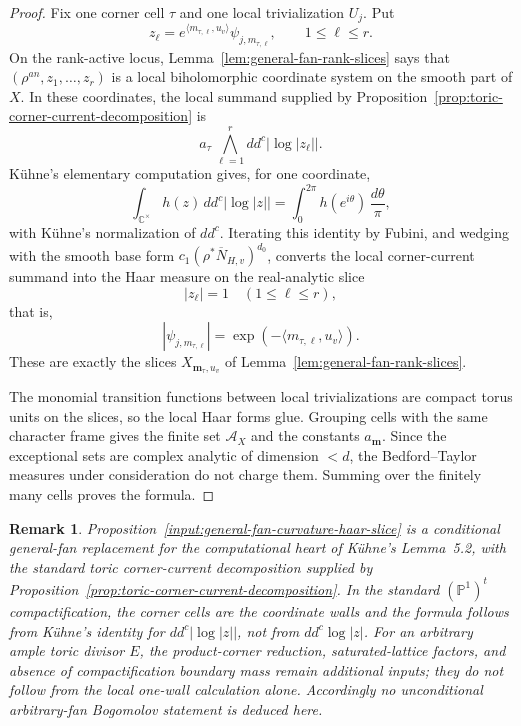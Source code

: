 \documentclass[10pt,a4paper]{amsart}
\theoremstyle{plain}
\newtheorem{remark}[theorem]{Remark}
\theoremstyle{plain}
\numberwithin{equation}{section}
\providecommand{\bN}{\overline{N}}
\begin{document}
\begin{proof}
	Fix one corner cell \(\tau\) and one local trivialization \(U_j\).  Put
	\[
	z_\ell
	=
	e^{\langle m_{\tau,\ell},u_v\rangle}
	\psi_{j,m_{\tau,\ell}},
	\qquad 1\le \ell\le r .
	\]
	On the rank-active locus, Lemma~\ref{lem:general-fan-rank-slices} says that
	\((\rho^{an},z_1,\ldots,z_r)\) is a local biholomorphic coordinate system on
	the smooth part of \(X\).  In these coordinates, the local summand supplied by
	Proposition~\ref{prop:toric-corner-current-decomposition} is
	\[
	a_\tau\,
	\bigwedge_{\ell=1}^r dd^c\bigl|\log|z_\ell|\bigr| .
	\]
	K\"uhne's elementary computation \cite[Appendix~B]{Ku1} gives, for one
	coordinate,
	\[
	\int_{\mathbb C^\times} h(z)\,dd^c\bigl|\log|z|\bigr|
	=
	\int_{0}^{2\pi}h(e^{i\theta})\,\frac{d\theta}{\pi},
	\]
	with K\"uhne's normalization of \(dd^c\).  Iterating this identity by Fubini,
	and wedging with the smooth base form
	\(c_1(\rho^*\bN_{H,v})^{d_0}\), converts the local corner-current summand into
	the Haar measure on the real-analytic slice
	\[
	|z_\ell|=1
	\quad(1\le \ell\le r),
	\]
	that is,
	\[
	|\psi_{j,m_{\tau,\ell}}|
	=
	\exp(-\langle m_{\tau,\ell},u_v\rangle).
	\]
	These are exactly the slices
	\(X_{\mathbf m_\tau,u_v}\) of
	Lemma~\ref{lem:general-fan-rank-slices}.
	
	The monomial transition functions between local trivializations are compact
	torus units on the slices, so the local Haar forms glue.  Grouping cells with
	the same character frame gives the finite set \(\mathcal A_X\) and the
	constants \(a_{\mathbf m}\).  Since the exceptional sets are complex analytic
	of dimension \(<d\), the Bedford--Taylor measures under consideration do not
	charge them.  Summing over the finitely many cells proves the formula.
\end{proof}

\begin{remark}
	Proposition~\ref{input:general-fan-curvature-haar-slice} is a conditional
	general-fan replacement for the computational heart of K\"uhne's Lemma~5.2,
	with the standard toric corner-current decomposition supplied by
	Proposition~\ref{prop:toric-corner-current-decomposition}.  In the standard
	\((\mathbb P^1)^t\) compactification, the corner cells are the coordinate
	walls and the formula follows from K\"uhne's identity for
	\(dd^c\bigl|\log|z|\bigr|\), not from \(dd^c\log|z|\).  For an arbitrary ample
	toric divisor \(E\), the product-corner reduction, saturated-lattice factors,
	and absence of compactification boundary mass remain additional inputs; they
	do not follow from the local one-wall calculation alone.  Accordingly no
	unconditional arbitrary-fan Bogomolov statement is deduced here.
\end{remark}
\end{document}
